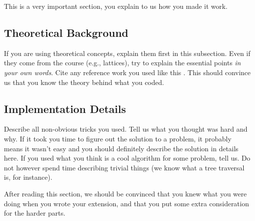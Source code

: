 This is a very important section, you explain to us how you made it work.

\subsection{Theoretical Background}
If you are using theoretical concepts, explain them first in this subsection.
Even if they come from the course (e.g., lattices), try to explain the essential
points \emph{in your own words}. Cite any reference work you used like this
\cite{TigerBook}. This should convince us that you know the theory behind what
you coded.

\subsection{Implementation Details}
Describe all non-obvious tricks you used. Tell us what you thought was hard and
why. If it took you time to figure out the solution to a problem, it probably
means it wasn't easy and you should definitely describe the solution in details
here. If you used what you think is a cool algorithm for some problem, tell us.
Do not however spend time describing trivial things (we know what a tree traversal
is, for instance).

After reading this section, we should be convinced that you knew what you were
doing when you wrote your extension, and that you put some extra consideration
for the harder parts.
